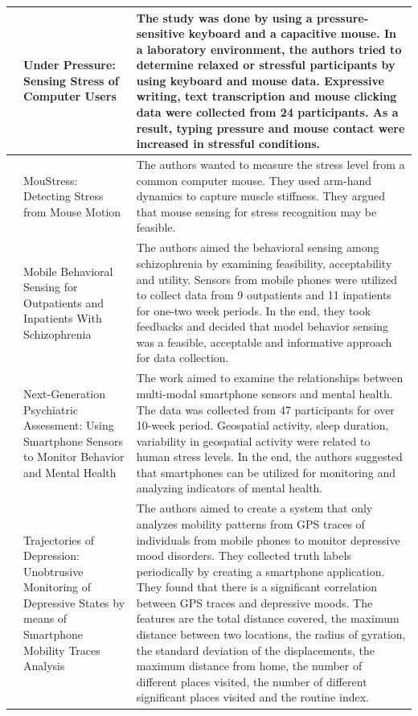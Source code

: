 \documentclass[12pt,oneandhalf,chaparabic,lfm,phd,eng,oneside,pntc]{gsufbe}
\begin{document}
\begin{longtable}[c]{| P{2cm} | P{3cm} | P{9cm} |}
\cite{hernandez2014under} & Under Pressure: Sensing Stress of Computer Users & The study was done by using a pressure-sensitive keyboard and a capacitive mouse. In a laboratory environment, the authors tried to determine relaxed or stressful participants by using keyboard and mouse data. Expressive writing, text transcription and mouse clicking data were collected from 24 participants. As a result, typing pressure and mouse contact were increased in stressful conditions. \\ \hline
\cite{sun2014moustress} & MouStress: Detecting Stress from Mouse Motion & The authors wanted to measure the stress level from a common computer mouse. They used arm-hand dynamics to capture muscle stiffness. They argued that mouse sensing for stress recognition may be feasible. \\ \hline
\cite{ben2015mobile} & Mobile Behavioral Sensing for Outpatients and Inpatients With Schizophrenia & The authors aimed the behavioral sensing among schizophrenia by examining feasibility, acceptability and utility. Sensors from mobile phones were utilized to collect data from 9 outpatients and 11 inpatients for one-two week periods. In the end, they took feedbacks and decided that model behavior sensing was a feasible, acceptable and informative approach for data collection. \\ \hline
\cite{ben2015next} & Next-Generation Psychiatric Assessment: Using Smartphone Sensors to Monitor Behavior and Mental Health & The work aimed to examine the relationships between multi-modal smartphone sensors and mental health. The data was collected from 47 participants for over 10-week period. Geospatial activity, sleep duration, variability in geospatial activity were related to human stress levels. In the end, the authors suggested that smartphones can be utilized for monitoring and analyzing indicators of mental health. \\ \hline
\cite{canzian2015trajectories} & Trajectories of Depression: Unobtrusive Monitoring of Depressive States by means of Smartphone Mobility Traces Analysis & The authors aimed to create a system that only analyzes mobility patterns from GPS traces of individuals from mobile phones to monitor depressive mood disorders. They collected truth labels periodically by creating a smartphone application. They found that there is a significant correlation between GPS traces and depressive moods. The features are the total distance covered, the maximum distance between two locations, the radius of gyration, the standard deviation of the displacements, the maximum distance from home, the number of different places visited, the number of different significant places visited and the routine index. \\ \hline

\end{longtable}
\end{document}
